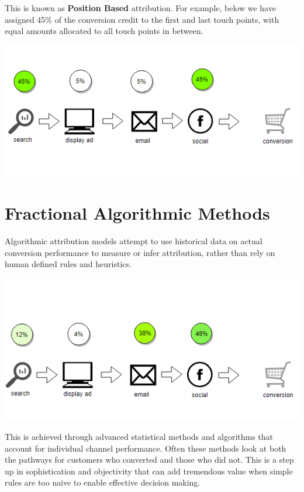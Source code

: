 \documentclass[]{book}
\begin{document}
This is known as \textbf{Position Based} attribution. For example, below we have assigned
45\% of the conversion credit to the first and last touch points, with equal
amounts allocated to all touch points in between.

\includegraphics[width=5.73in]{img/position_based}

\hypertarget{fractional-algorithmic-methods}{%
\section{Fractional Algorithmic Methods}\label{fractional-algorithmic-methods}}

Algorithmic attribution models attempt to use historical data on actual
conversion performance to measure or infer attribution, rather than rely on
human defined rules and heuristics.

\includegraphics[width=5.67in]{img/fractional}

This is achieved through advanced statistical methods and algorithms that
account for individual channel performance. Often these methods look at both
the pathways for customers who converted and those who did not. This is a step
up in sophistication and objectivity that can add tremendous value when simple
rules are too naive to enable effective decision making.
\end{document}

